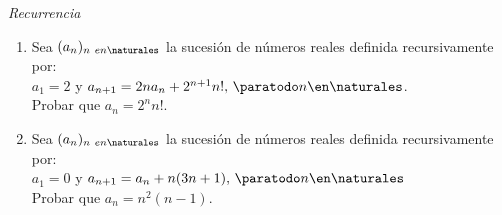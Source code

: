 \separador
\textit{Recurrencia}
\ejercicio
\begin{enumerate}[label=\roman*)]
	\item
	      Sea $(a_n)_{n\ en \naturales}$ la sucesión de números reales definida recursivamente por:\\
	      $a_1 = 2$ y $a_{n+1} = 2 n a_n+ 2^{n+1}n!,\, \paratodo n \en \naturales$.\\
	      Probar que $a_n = 2^n n!$.\\

	\item
	      Sea $(a_n)_{n\ en \naturales}$ la sucesión de números reales definida recursivamente por:\\
	      $a_1 = 0$ y $a_{n+1} = a_n + n(3n + 1),\, \paratodo n \en \naturales$\\
	      Probar que $a_n = n^2 (n-1)$.\\

\end{enumerate}
